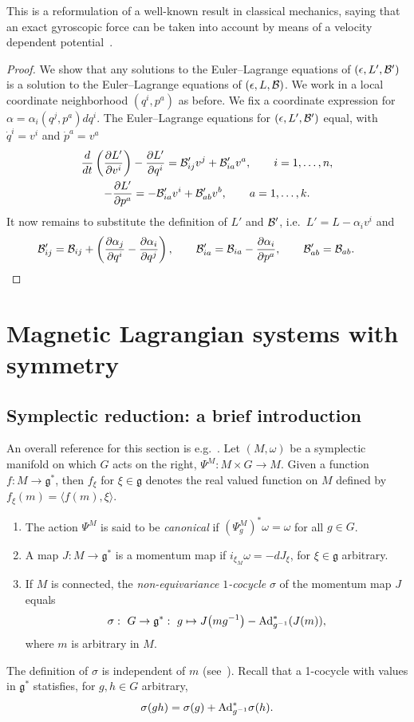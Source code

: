 \documentclass[pdftex]{sigma}
\newcommand{\B}{{\cal B}}
\newcommand{\e}{\epsilon}
\newcommand{\lag}{\mathfrak{g}}
\def\fpd#1#2{\frac{\partial #1}{\partial #2}}
\begin{document}
This is a reformulation of a well-known result in classical mechanics, saying that an exact gyroscopic force can be taken into account by means of a velocity dependent potential~\cite{pars}.
\begin{proof}
We show that any solutions to the Euler--Lagrange equations of $(\e, L',\B ')$ is a solution to the Euler--Lagrange equations of $(\e,L,\B)$. We work in a local coordinate neighborhood $(q^i,p^a)$ as before. We f\/ix a coordinate expression for $\alpha=\alpha_i(q^j,p^a)dq^i$. The Euler--Lagrange equations for $(\e,L',\B')$ equal, with $\dot q^i= v^i$ and $\dot p^a= v^a$
\begin{gather*}
\frac{d}{dt}\left(\fpd{L'}{v^i}\right) -\fpd{L'}{q^i}=\B'_{ij}v^j + \B'_{ia} v^a,\qquad i=1,\ldots,n,\\
  -\fpd{L'}{p^a}=-\B'_{ia}v^i + \B'_{ab} v^b,\qquad a=1,\ldots,k.
\end{gather*}
It now remains to substitute the def\/inition of $L'$ and $\B'$, i.e.\ $L'= L - \alpha_i v^i$ and
\begin{gather*}
\B'_{ij} = \B_{ij} + \left(\fpd{\alpha_j}{q^i}-\fpd{\alpha_i}{q^j}\right), \qquad \B'_{ia} = \B_{ia} - \fpd{\alpha_i}{p^a}, \qquad \B'_{ab} = \B_{ab}. \tag*{\qed}
\end{gather*}
\renewcommand{\qed}{}\end{proof}


\section{Magnetic Lagrangian systems with symmetry}\label{section4}

\subsection{Symplectic reduction: a brief introduction}\label{section4.1}

An overall reference for this section is e.g.~\cite{MarsdenHamRed}. Let $(M,\omega)$ be a symplectic manifold on which $G$ acts on the right, $\Psi^M:M\times G\to M$. Given a function $f: M\to \lag^*$, then $f_\xi$ for $\xi\in\lag$ denotes the real valued function on $M$ def\/ined by $f_\xi(m)= \langle f(m),\xi\rangle$.
\begin{definition}\label{def:cocycle}\mbox{}
\begin{enumerate}\itemsep=0pt
\item The action $\Psi^M$  is said to be {\em canonical} if $(\Psi^M_g)^*\omega=\omega$ for all $g\in G$.
\item A map $J:M\to \lag^*$ is a momentum map if $i_{\xi_M}\omega=-dJ_\xi$, for $\xi \in\lag$ arbitrary.
\item If $M$ is connected, the {\em non-equivariance $1$-cocycle} $\sigma$ of the momentum map $J$ equals
\[
\sigma: \ G\to \lag^*: \ g\mapsto J\big(mg^{-1}\big)-{\rm Ad}^*_{g^{-1}}(J(m)),
\]
where $m$ is arbitrary in $M$.
\end{enumerate}\end{definition}
The def\/inition of $\sigma$ is independent of $m$ (see~\cite{Marsden}). Recall that a 1-cocycle with values in $\lag^*$ statisf\/ies, for $g,h\in G$ arbitrary,
\[
\sigma(gh)=\sigma(g)+ {\rm Ad}^*_{g^{-1}}\sigma(h).
\]
\end{document}
